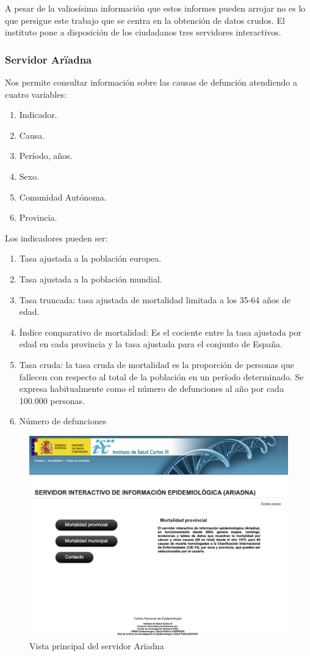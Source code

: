 A pesar de la valiosísima información que estos informes pueden arrojar no es lo que persigue este trabajo que se
centra en la obtención de datos crudos. El instituto pone a disposición de los ciudadanos tres servidores interactivos.

\subsubsection{Servidor Arïadna}
Nos permite consultar información sobre las causas de defunción atendiendo a cuatro variables:
\begin{enumerate}
  \item Indicador.
  \item Causa.
  \item Período, años.
  \item Sexo.
  \item Comunidad Autónoma.
  \item Provincia.
\end{enumerate}

Los indicadores pueden ser:
\begin{enumerate}
  \item Tasa ajustada a la población europea.
  \item Tasa ajustada a la población mundial.
  \item Tasa truncada: tasa ajustada de mortalidad limitada a los 35-64 años de edad.
  \item Índice comparativo de mortalidad: Es el cociente entre la tasa ajustada por edad en cada provincia y la tasa
  ajustada para el conjunto de España.
  \item Tasa cruda: la tasa cruda de mortalidad es la proporción de personas que fallecen con respecto al total
  de la población en un período determinado. Se expresa habitualmente como el número de defunciones al año
  por cada 100.000 personas.
  \item Número de defunciones
\end{enumerate}

\begin{figure}[]
	\centering
	\includegraphics[scale=0.5]{doc/logos/imgs/ariadna1.png}
	\caption{ \cite{ariadna} Vista principal del servidor Arïadna }
    \label{fig:worst_f_value}
\end{figure}

